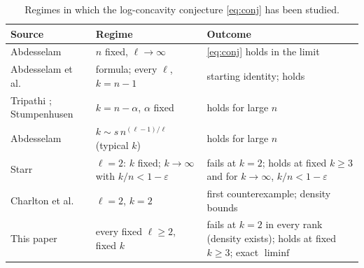 \documentclass[11pt,a4paper]{article}
\theoremstyle{remark}
\numberwithin{equation}{section}
\begin{document}
\begin{table}[ht]
\centering\small
\begin{tabular}{@{}p{}p{}p{}@{}}
\toprule
Source & Regime & Outcome\\
\midrule
Abdesselam \cite{Abdesselam2025a} & $n$ fixed, $\ell\to\infty$ & \eqref{eq:conj} holds in the limit\\
Abdesselam et al.\ \cite{ABDV} & formula; every $\ell$, $k=n-1$ & starting identity; holds\\
Tripathi \cite{Tripathi}; Stumpenhusen \cite{Stumpenhusen} & $k=n-\alpha$, $\alpha$ fixed & holds for large $n$\\
Abdesselam \cite{Abdesselam2025b} & $k\sim s\,n^{(\ell-1)/\ell}$ (typical $k$) & holds for large $n$\\
Starr \cite{Starr2026a,Starr2026b} & $\ell=2$: $k$ fixed; $k\to\infty$ with $k/n<1-\varepsilon$ & fails at $k=2$; holds at fixed $k\ge3$ and for $k\to\infty$, $k/n<1-\varepsilon$\\
Charlton et al.\ \cite{CHS2026} & $\ell=2$, $k=2$ & first counterexample; density bounds\\
This paper & every fixed $\ell\ge2$, fixed $k$ & fails at $k=2$ in every rank (density exists); holds at fixed $k\ge3$; exact $\liminf$\\
\bottomrule
\end{tabular}
\caption{Regimes in which the log-concavity conjecture \eqref{eq:conj} has been studied.}\label{tab:prior}
\end{table}
\end{document}
